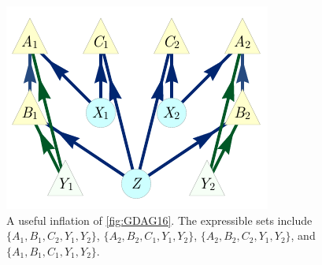 \documentclass[aps,english,superscriptaddress,onecolumn,twoside,longbibliography,pra,floatfix,fleqn,nofootinbib]{revtex4-1}%
\theoremstyle{definition}
\begin{document}
\begin{figure}[b]
\centering
\includegraphics[scale=1]{scen16InflationDAG.pdf}
\caption{A useful inflation of \cref{fig:GDAG16}. The expressible sets include $\{A_1,B_1,C_2,Y_1,Y_2\}$, $\{A_2,B_2,C_1,Y_1,Y_2\}$, $\{A_2,B_2,C_2,Y_1,Y_2\}$, and $\{A_1,B_1,C_1,Y_1,Y_2\}$. }\label{fig:Inflated16}
\end{figure}
\end{document}
